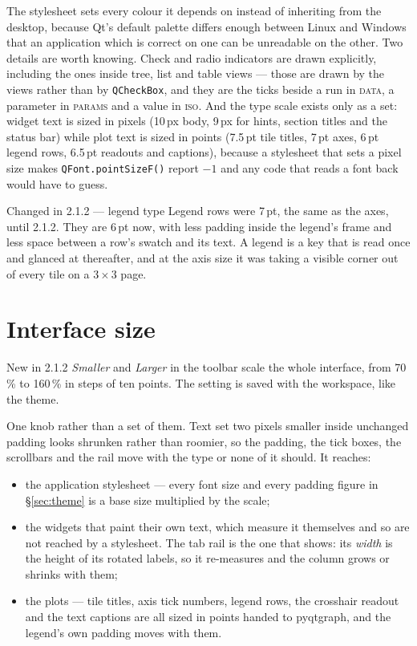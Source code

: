 \documentclass[11pt,a4paper,oneside]{report}
\newcommand{\appver}{2.1.2}
\newcommand{\code}[1]{\texttt{#1}}
\newcommand{\tab}[1]{\textsc{#1}}
\begin{document}
The stylesheet sets every colour it depends on instead of inheriting from the
desktop, because Qt's default palette differs enough between Linux and Windows
that an application which is correct on one can be unreadable on the other. Two
details are worth knowing. Check and radio indicators are drawn explicitly,
including the ones inside tree, list and table views --- those are drawn by the
views rather than by \code{QCheckBox}, and they are the ticks beside a run in
\tab{data}, a parameter in \tab{params} and a value in \tab{iso}. And the type
scale exists only as a set: widget text is sized in pixels (10\,px body, 9\,px
for hints, section titles and the status bar) while plot text is sized in points
(7.5\,pt tile titles, 7\,pt axes, 6\,pt legend rows, 6.5\,pt readouts and
captions), because a stylesheet that sets a pixel size makes
\code{QFont.pointSizeF()} report $-1$ and any code that reads a font back would
have to guess.

\begin{aoenew}{Changed in \appver{} --- legend type}
Legend rows were 7\,pt, the same as the axes, until \appver. They are 6\,pt now,
with less padding inside the legend's frame and less space between a row's
swatch and its text. A legend is a key that is read once and glanced at
thereafter, and at the axis size it was taking a visible corner out of every
tile on a $3 \times 3$ page.
\end{aoenew}

\section{Interface size}
\label{sec:uiscale}

\begin{aoenew}{New in \appver}
\emph{Smaller} and \emph{Larger} in the toolbar scale the whole interface,
from 70\,\% to 160\,\% in steps of ten points. The setting is saved with the
workspace, like the theme.
\end{aoenew}

One knob rather than a set of them. Text set two pixels smaller inside
unchanged padding looks shrunken rather than roomier, so the padding, the tick
boxes, the scrollbars and the rail move with the type or none of it should. It
reaches:

\begin{itemize}
\item the application stylesheet --- every font size and every padding figure
  in \S\ref{sec:theme} is a base size multiplied by the scale;
\item the widgets that paint their own text, which measure it themselves and
  so are not reached by a stylesheet. The tab rail is the one that shows: its
  \emph{width} is the height of its rotated labels, so it re-measures and the
  column grows or shrinks with them;
\item the plots --- tile titles, axis tick numbers, legend rows, the crosshair
  readout and the text captions are all sized in points handed to pyqtgraph,
  and the legend's own padding moves with them.
\end{itemize}
\end{document}
